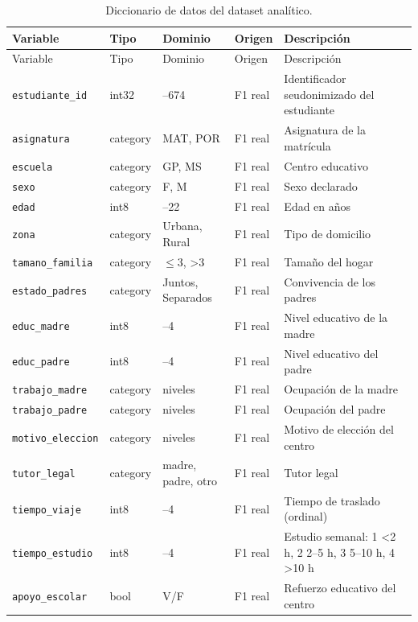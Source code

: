 {\scriptsize
\begin{longtable}{>{\raggedright\arraybackslash}p{3.9cm}p{1.2cm}>{\raggedright\arraybackslash}p{2.0cm}>{\raggedright\arraybackslash}p{2.3cm}>{\raggedright\arraybackslash}p{4.8cm}}
\caption{Diccionario de datos del dataset analítico.}\label{tab:diccionario}\\
\toprule
Variable & Tipo & Dominio & Origen & Descripción \\
\midrule
\endfirsthead
\toprule
Variable & Tipo & Dominio & Origen & Descripción \\
\midrule
\endhead
\texttt{estudiante\_id} & int32 & 1–674 & F1 real & Identificador seudonimizado del estudiante \\
\texttt{asignatura} & category & MAT, POR & F1 real & Asignatura de la matrícula \\
\texttt{escuela} & category & GP, MS & F1 real & Centro educativo \\
\texttt{sexo} & category & F, M & F1 real & Sexo declarado \\
\texttt{edad} & int8 & 15–22 & F1 real & Edad en años \\
\texttt{zona} & category & Urbana, Rural & F1 real & Tipo de domicilio \\
\texttt{tamano\_familia} & category & $\leq$3, >3 & F1 real & Tamaño del hogar \\
\texttt{estado\_padres} & category & Juntos, Separados & F1 real & Convivencia de los padres \\
\texttt{educ\_madre} & int8 & 0–4 & F1 real & Nivel educativo de la madre \\
\texttt{educ\_padre} & int8 & 0–4 & F1 real & Nivel educativo del padre \\
\texttt{trabajo\_madre} & category & 5 niveles & F1 real & Ocupación de la madre \\
\texttt{trabajo\_padre} & category & 5 niveles & F1 real & Ocupación del padre \\
\texttt{motivo\_eleccion} & category & 4 niveles & F1 real & Motivo de elección del centro \\
\texttt{tutor\_legal} & category & madre, padre, otro & F1 real & Tutor legal \\
\texttt{tiempo\_viaje} & int8 & 1–4 & F1 real & Tiempo de traslado (ordinal) \\
\texttt{tiempo\_estudio} & int8 & 1–4 & F1 real & Estudio semanal: 1 <2 h, 2 2–5 h, 3 5–10 h, 4 >10 h \\
\texttt{apoyo\_escolar} & bool & V/F & F1 real & Refuerzo educativo del centro \\

\end{longtable}}
